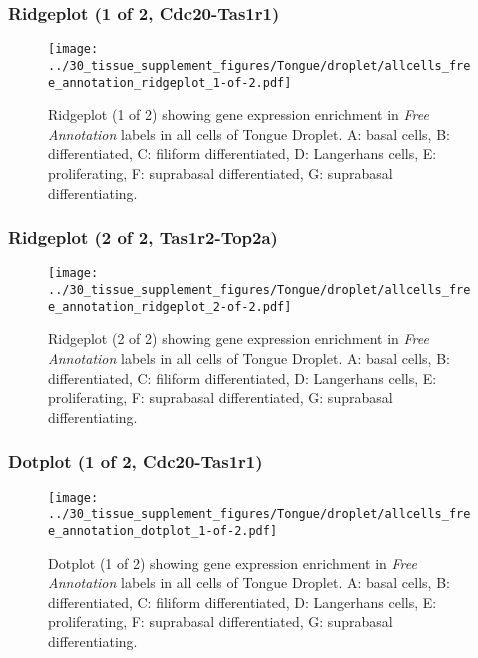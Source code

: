 \subsubsection{Ridgeplot (1 of 2, Cdc20-Tas1r1)}
\begin{figure}[h]
\centering
\texttt{[image: ../30\_tissue\_supplement\_figures/Tongue/droplet/allcells\_free\_annotation\_ridgeplot\_1-of-2.pdf]}

\caption{ Ridgeplot (1 of 2)  showing gene expression enrichment in \emph{Free Annotation} labels in all cells of Tongue Droplet. A: basal cells, B: differentiated, C: filiform differentiated, D: Langerhans cells, E: proliferating, F: suprabasal differentiated, G: suprabasal differentiating.}
\end{figure}


\clearpage

\subsubsection{Ridgeplot (2 of 2, Tas1r2-Top2a)}
\begin{figure}[h]
\centering
\texttt{[image: ../30\_tissue\_supplement\_figures/Tongue/droplet/allcells\_free\_annotation\_ridgeplot\_2-of-2.pdf]}

\caption{ Ridgeplot (2 of 2)  showing gene expression enrichment in \emph{Free Annotation} labels in all cells of Tongue Droplet. A: basal cells, B: differentiated, C: filiform differentiated, D: Langerhans cells, E: proliferating, F: suprabasal differentiated, G: suprabasal differentiating.}
\end{figure}


\clearpage

\subsubsection{Dotplot (1 of 2, Cdc20-Tas1r1)}
\begin{figure}[h]
\centering
\texttt{[image: ../30\_tissue\_supplement\_figures/Tongue/droplet/allcells\_free\_annotation\_dotplot\_1-of-2.pdf]}

\caption{ Dotplot (1 of 2)  showing gene expression enrichment in \emph{Free Annotation} labels in all cells of Tongue Droplet. A: basal cells, B: differentiated, C: filiform differentiated, D: Langerhans cells, E: proliferating, F: suprabasal differentiated, G: suprabasal differentiating.}
\end{figure}


